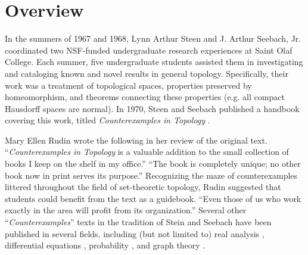 



  \section{Overview}

  In the summers of 1967 and 1968, Lynn Arthur Steen and
  J. Arthur Seebach, Jr. coordinated two NSF-funded undergraduate
  research experiences at Saint Olaf College. Each summer, five undergraduate
  students assisted them in investigating and cataloging known and novel
  results in general topology. Specifically, their work was a treatment
  of topological spaces, properties preserved by homeomorphism,
  and theorems connecting these properties (e.g. all compact Hausdorff
  spaces are normal). In 1970, Steen and Seebach published a handbook
  covering this work, titled \textit{Counterexamples in Topology}
  \cite{MR1382863}.

  Mary Ellen Rudin wrote the following in her review \cite{MR1536430}
  of the original text.
  ``\textit{Counterexamples in Topology} is a valuable addition to the small
  collection of books I keep on the shelf in my office.'' ``The book is
  completely unique; no other book now in print serves its purpose.''
  Recognizing the maze of counterexamples littered throughout the
  field of set-theoretic topology, Rudin suggested that students could
  benefit from the text as a guidebook.
  ``Even those of us who work exactly in the area will profit from
  its organization.'' Several other ``\textit{Counterexamples}'' texts
  in the tradition of Stein and Seebach have been published in several fields,
  including (but not limited to) real analysis \cite{MR1256489}, differential
  equations \cite{MR1113487}, probability \cite{MR930671}, and
  graph theory \cite{MR0491272}.


